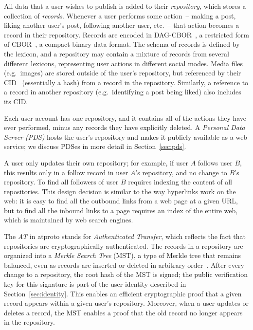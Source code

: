 \documentclass[sigconf,nonacm]{acmart}
\begin{document}
All data that a user wishes to publish is added to their \emph{repository}, which stores a collection of \emph{records}.
Whenever a user performs some action~-- making a post, liking another user's post, following another user, etc.~-- that action becomes a record in their repository.
Records are encoded in DAG-CBOR~\cite{DAG-CBOR}, a restricted form of CBOR~\cite{CBOR}, a compact binary data format.
The schema of records is defined by the lexicon, and a repository may contain a mixture of records from several different lexicons, representing user actions in different social modes.
Media files (e.g.\ images) are stored outside of the user's repository, but referenced by their CID~\cite{CID} (essentially a hash) from a record in the repository.
Similarly, a reference to a record in another repository (e.g.\ identifying a post being liked) also includes its CID.

Each user account has one repository, and it contains all of the actions they have ever performed, minus any records they have explicitly deleted.
A \emph{Personal Data Server (PDS)} hosts the user's repository and makes it publicly available as a web service; we discuss PDSes in more detail in Section~\ref{sec:pds}.

A user only updates their own repository; for example, if user $A$ follows user $B$, this results only in a follow record in user $A$'s repository, and no change to $B$'s repository.
To find all followers of user $B$ requires indexing the content of all repositories.
This design decision is similar to the way hyperlinks work on the web: it is easy to find all the outbound links from a web page at a given URL, but to find all the inbound links to a page requires an index of the entire web, which is maintained by web search engines.

The \emph{AT} in atproto stands for \emph{Authenticated Transfer}, which reflects the fact that repositories are cryptographically authenticated.
The records in a repository are organized into a \emph{Merkle Search Tree} (MST), a type of Merkle tree that remains balanced, even as records are inserted or deleted in arbitrary order~\cite{Auvolat:2019}.
After every change to a repository, the root hash of the MST is signed; the public verification key for this signature is part of the user identity described in Section~\ref{sec:identity}.
This enables an efficient cryptographic proof that a given record appears within a given user's repository.
Moreover, when a user updates or deletes a record, the MST enables a proof that the old record no longer appears in the repository.
\end{document}
